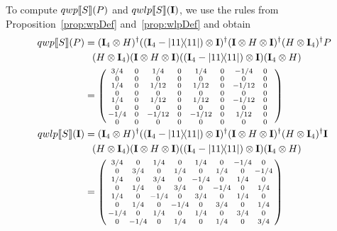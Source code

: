 \documentclass[a4paper,UKenglish,cleveref, autoref, thm-restate]{lipics-v2021}
\begin{document}
  To compute $qwp\llbracket S \rrbracket (P)$ and $qwlp\llbracket S \rrbracket (\textbf{I})$, we use the rules from Proposition~\ref{prop:wpDef} and~\ref{prop:wlpDef} and obtain
\begin{align*}
  \qwp{S}{P} &= (\identityOpVar{4} \otimes H)^\dagger ((\identityOpVar{4}-\ketbra{11}{11})\otimes \identityOp)^\dagger (\identityOp \otimes H \otimes \identityOp)^\dagger (H \otimes \identityOpVar{4})^\dagger P \\
  & \phantom{=}(H \otimes \identityOpVar{4}) (\identityOp \otimes H \otimes \identityOp) ((\identityOpVar{4}-\ketbra{11}{11})\otimes \identityOp)(\identityOpVar{4} \otimes H)\\
  &= \left(\begin{smallmatrix}
    3/4 & \makebox[0.2cm]{ }0\makebox[0.2cm]{ } & 1/4 & \makebox[0.2cm]{ }0\makebox[0.2cm]{ } & 1/4 & \makebox[0.2cm]{ }0\makebox[0.2cm]{ } & -1/4 & \makebox[0.2cm]{ }0\makebox[0.2cm]{ }\\
    0 & 0 & 0 & 0 & 0 & 0 & 0 & 0\\
    1/4 & 0 & 1/12 & 0 & 1/12& 0 & -1/12 & 0 \\
    0 & 0 & 0 & 0 & 0 & 0 & 0 & 0\\
    1/4 & 0 & 1/12 & 0 & 1/12& 0 & -1/12 & 0 \\
    0 & 0 & 0 & 0 & 0 & 0 & 0 & 0\\
    -1/4 & 0 & -1/12 & 0 & -1/12& 0 & 1/12 & 0 \\
    0 & 0 & 0 & 0 & 0 & 0 & 0 & 0\\
  \end{smallmatrix}\right)\\
  \qwlp{S}{\identityOp} &=(\identityOpVar{4} \otimes H)^\dagger ((\identityOpVar{4}-\ketbra{11}{11})\otimes \identityOp)^\dagger (\identityOp \otimes H \otimes \identityOp)^\dagger (H \otimes \identityOpVar{4})^\dagger \identityOp \\
  & \phantom{=}(H \otimes \identityOpVar{4}) (\identityOp \otimes H \otimes \identityOp) ((\identityOpVar{4}-\ketbra{11}{11})\otimes \identityOp)(\identityOpVar{4} \otimes H)\\
  &= \left(\begin{smallmatrix}
    3/4 & 0 & 1/4 & 0 & 1/4 & 0 & -1/4 & 0 \\
    0 & 3/4 & 0 & 1/4 & 0 & 1/4 & 0 & -1/4\\
    1/4 & 0 & 3/4 & 0 & - 1/4 & 0 & 1/4 & 0 \\
    0 & 1/4 & 0 & 3/4 & 0 & -1/4 & 0 & 1/4\\
    1/4 & 0 & -1/4 & 0 & 3/4& 0 & 1/4 & 0 \\
    0 & 1/4 & 0 & -1/4 & 0 & 3/4 & 0 & 1/4\\
    -1/4 & 0 & 1/4 & 0 & 1/4& 0 & 3/4 & 0 \\
    0 & -1/4 & 0 & 1/4 & 0 & 1/4 & 0 & 3/4\\
  \end{smallmatrix}\right)
\end{align*}

 
\end{document}
